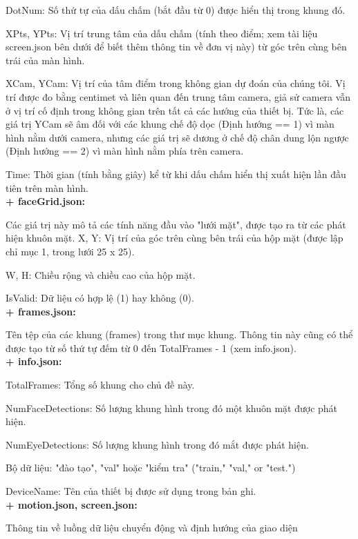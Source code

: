 \begin{itemize}
    DotNum: Số thứ tự của dấu chấm (bắt đầu từ 0) được hiển thị trong khung đó.
    
     XPts, YPts: Vị trí trung tâm của dấu chấm (tính theo điểm; xem tài liệu screen.json bên dưới để biết thêm thông tin về đơn vị này) từ góc trên cùng bên trái của màn hình.
     
     XCam, YCam: Vị trí của tâm điểm trong không gian dự đoán của chúng tôi. Vị trí được đo bằng centimet và liên quan đến trung tâm camera, giả sử camera vẫn ở vị trí cố định trong không gian trên tất cả các hướng của thiết bị. Tức là, các giá trị YCam sẽ âm đối với các khung chế độ dọc (Định hướng == 1) vì màn hình nằm dưới camera, nhưng các giá trị sẽ dương ở chế độ chân dung lộn ngược (Định hướng == 2) vì màn hình nằm phía trên camera.
     
     Time: Thời gian (tính bằng giây) kể từ khi dấu chấm hiển thị xuất hiện lần đầu tiên trên màn hình.
\\

    
\textbf{+ faceGrid.json:}

    Các giá trị này mô tả các tính năng đầu vào "lưới mặt", được tạo ra từ các phát hiện khuôn mặt.
    X, Y: Vị trí của góc trên cùng bên trái của hộp mặt (được lập chỉ mục 1, trong lưới 25 x 25).
    
    W, H: Chiều rộng và chiều cao của hộp mặt.
    
    IsValid: Dữ liệu có hợp lệ (1) hay không (0).
 \\
   
    
\textbf{+ frames.json:}

Tên tệp của các khung (frames) trong thư mục khung. Thông tin này cũng có thể được tạo từ số thứ tự đếm từ 0 đến TotalFrames - 1 (xem info.json).
\\

\textbf{+ info.json:}

    TotalFrames: Tổng số khung cho chủ đề này.
    
     NumFaceDetections: Số lượng khung hình trong đó một khuôn mặt được phát hiện.
     
     NumEyeDetections: Số lượng khung hình trong đó mắt được phát hiện.
     
     Bộ dữ liệu: "đào tạo", "val" hoặc "kiểm tra" ("train," "val," or "test.")
     
     DeviceName: Tên của thiết bị được sử dụng trong bản ghi.
\\
    
\textbf{+ motion.json, screen.json:}

Thông tin về  luồng dữ liệu chuyển động và định hướng của giao diện
\end{itemize}


